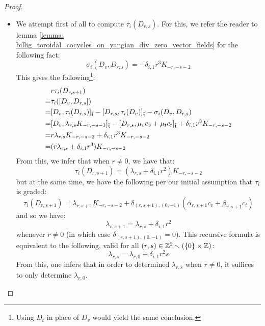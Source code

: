 \begin{proof}
                \begin{itemize}
                    \item We attempt first of all to compute $\tau_i(D_{r, s})$. For this, we refer the reader to lemma \ref{lemma: billig_toroidal_cocycles_on_yangian_div_zero_vector_fields} for the following fact:
                        $$\sigma_i(D_v, D_{r, s}) = -\delta_{i, 1} r^3 K_{-r, -s - 2}$$
                    This gives the following\footnote{Using $D_t$ in place of $D_v$ would yield the same conclusion.}:
                        $$
                            \begin{aligned}
                                & r \tau_i(D_{r, s + 1})
                                \\
                                = & \tau_i([D_v, D_{r, s}])
                                \\
                                = & [D_v, \tau_i(D_{r, s})]_{\hat{\mathfrak{t}}} - [D_{r, s}, \tau_i(D_v)]_{\hat{\mathfrak{t}}} - \sigma_i(D_v, D_{r, s})
                                \\
                                = & [D_v, \lambda_{r, s} K_{-r, -s - 1}]_{\hat{\mathfrak{t}}} - [D_{r, s}, \mu_v c_v + \mu_t c_t]_{\hat{\mathfrak{t}}} + \delta_{i, 1} r^3 K_{-r, -s - 2}
                                \\
                                = & r \lambda_{r, s} K_{-r, -s - 2} + \delta_{i, 1} r^3 K_{-r, -s - 2}
                                \\
                                = & ( r \lambda_{r, s} + \delta_{i, 1} r^3 ) K_{-r, -s - 2}
                            \end{aligned}
                        $$
                    From this, we infer that when $r \not = 0$, we have that:
                        $$\tau_i(D_{r, s + 1}) = (\lambda_{r, s} + \delta_{i, 1} r^2) K_{-r, -s - 2}$$
                    but at the same time, we have the following per our initial assumption that $\tau_i$ is graded:
                        $$\tau_i(D_{r, s + 1}) = \lambda_{r, s + 1} K_{-r, -s - 2} + \delta_{(r, s + 1), (0, -1)} ( \alpha_{r, s + 1} c_v + \beta_{r, s + 1} c_t )$$
                    and so we have:
                        $$\lambda_{r, s + 1} = \lambda_{r, s} + \delta_{i, 1} r^2$$
                    whenever $r \not = 0$ (in which case $\delta_{(r, s + 1), (0, -1)} = 0$). This recursive formula is equivalent to the following, valid for all $(r, s) \in \Z^2 \setminus ( \{0\} \x \Z )$:
                        \begin{equation} \label{equation: lambda_rs_coefficients_recursion}
                            \lambda_{r, s} = \lambda_{r, 0} + \delta_{i, 1} r^2 s
                        \end{equation}
                    From this, one infers that in order to determined $\lambda_{r, s}$ when $r \not = 0$, it suffices to only determine $\lambda_{r, 0}$.
                    

\end{itemize}
\end{proof}
